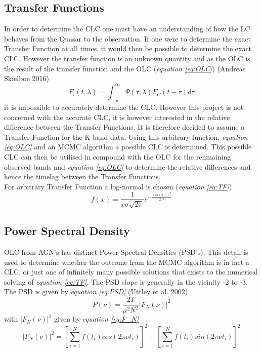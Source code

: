 \documentclass[twocolumn]{article}
\begin{document}
\subsection{Transfer Functions}
In order to determine the CLC one must have an understanding of how the LC behaves from the Quasar to the observation. If one were to determine the exact Transfer Function at all times, it would then be possible to determine the exact CLC. However the transfer function is an unknown quantity and as the OLC is the result of the transfer function and the OLC (\emph{equation \ref{eq:OLC}}) (Andreas Skielboe 2016)
\begin{equation}
F_l(t,\lambda) = \int_{-\infty}^{\infty}\Psi(\tau,\lambda)F_C(t-\tau)d\tau
\label{eq:OLC}
\end{equation}
it is impossible to accurately determine the CLC. However this project is not concerned with the accurate CLC, it is however interested in the relative difference between the Transfer Functions. It is therefore decided to assume a Transfer Function for the K-band data. Using this arbitrary function, \emph{equation \ref{eq:OLC}} and an MCMC algorithm a possible CLC is determined. This possible CLC can then be utilised in compound with the OLC for the renmaining observed bands and \emph{equation \ref{eq:OLC}} to determine the relative differences and hence the timelag between the Transfer Functions. \\
For arbitrary Transfer Function a log-normal is chosen (\emph{equation \ref{eq:TF}})
\begin{equation}
f(x) = \frac{1}{x\sigma\sqrt{2\pi}}e^{-\frac{(ln(x))^2}{2\sigma^2}}
\label{eq:TF}
\end{equation}

\subsection{Power Spectral Density}
OLC from AGN's has distinct Power Spectral Densities (PSD's). This detail is used to determine whether the outcome from the MCMC algorithm is in fact a CLC, or just one of infinitely many possible solutions that exists to the numerical solving of \emph{equation \ref{eq:TF}}. The PSD slope is generally in the vicinity -2 to -3. The PSD is given by \emph{equation \ref{eq:PSD}} (Uttley et al. 2002).
\begin{equation}
P(\nu) = \frac{2T}{\mu^2N^2}|F_N(\nu)|^2
\label{eq:PSD}
\end{equation}
with $|F_N(\nu)|^2$ given by \emph{equation \ref{eq:F_N}}
\begin{equation}
|F_N(\nu)|^2 = [\sum_{i=1}^{N}f(t_i)cos(2\pi\nu t_i)]^2 + [\sum_{i=1}^{N}f(t_i)sin(2\pi\nu t_i)]^2
\label{eq:F_N}
\end{equation}
\end{document}
